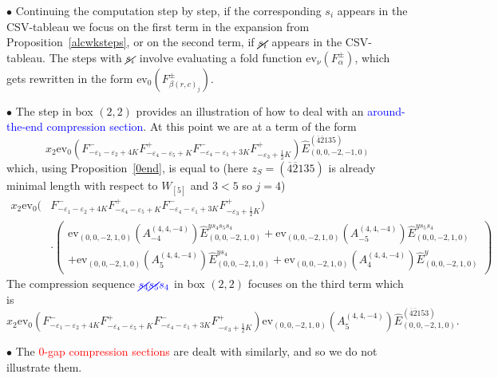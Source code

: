 \documentclass[11pt]{article}
\theoremstyle{plain}
\theoremstyle{definition}
\newenvironment{example}
  {\pushQED{\qed}\exampleinner}
  {\popQED\endexampleinner}
\theoremstyle{remark}
\numberwithin{equation}{section}
\def\ev{\mathrm{ev}}
\newcounter{r}
\newcounter{s}
\begin{document}
\begin{example}
\noindent
$\bullet$ Continuing the computation step by step, if the corresponding $s_i$ appears in the CSV-tableau we focus on the first term in the
expansion from Proposition~\ref{alcwksteps}, or on the second term, if $\cancel{s_i}$ appears in the CSV-tableau. 
The steps with $\cancel{s_i}$ involve evaluating a fold function $\ev_\nu(F_{\alpha}^{\pm})$, which gets rewritten in the
form $\ev_0(F^\pm_{\beta(r,c)_j})$.

\noindent
$\bullet$ The step in box $(2,2)$ provides an illustration of how to deal with an \textcolor{blue}{around-the-end compression section}. 
At this point we are at a term of the form
$$
x_2\ev_0(F^-_{-\varepsilon_1-\varepsilon_2+4K} F^+_{-\varepsilon_4-\varepsilon_5+K}
F^-_{-\varepsilon_4-\varepsilon_1+3K} F^+_{-\varepsilon_3+\frac12K}) \widehat{E}^{(\overline{4}\overline{2}135)}_{(0,0,-2,-1,0)}
$$
which, using Proposition~\ref{0end}, is equal to (here $z_S=(\overline{4}{\overline{2}135})$ is already minimal length with respect to $W_{[5]}$ and $3<5$ so $j=4$) 
\begin{align*}
x_2\ev_0(&F^-_{-\varepsilon_1-\varepsilon_2+4K} F^+_{-\varepsilon_4-\varepsilon_5+K}
F^-_{-\varepsilon_4-\varepsilon_1+3K} F^+_{-\varepsilon_3+\frac12K})
\\
&\cdot \left( \begin{array}{l}
\ev_{(0,0,-2,1,0)}(A^{(4,4,-4)}_{-4})\widehat{E}^{ys_4s_5s_4}_{(0,0,-2,1,0)}
+\ev_{(0,0,-2,1,0)}(A^{(4,4,-4)}_{-5})\widehat{E}^{ys_5s_4}_{(0,0,-2,1,0)}
\\
+\ev_{(0,0,-2,1,0)}(A^{(4,4,-4)}_{5})\widehat{E}^{ys_4}_{(0,0,-2,1,0)}
+\ev_{(0,0,-2,1,0)}(A^{(4,4,-4)}_{4})\widehat{E}^{y}_{(0,0,-2,1,0)}
\end{array}
\right)
\end{align*}
The compression sequence $\textcolor{blue}{\cancel{s_4}\cancel{s_5}s_4}$ in box $(2,2)$ focuses on the third term which is
$$x_2\ev_0(F^-_{-\varepsilon_1-\varepsilon_2+4K} F^+_{-\varepsilon_4-\varepsilon_5+K}
F^-_{-\varepsilon_4-\varepsilon_1+3K} F^+_{-\varepsilon_3+\frac12K})
\ev_{(0,0,-2,1,0)}(A^{(4,4,-4)}_{5})\widehat{E}^{(\overline{4}\overline{2}153)}_{(0,0,-2,1,0)}.
$$

\noindent
$\bullet$
The \textcolor{red}{$0$-gap compression sections} are dealt with similarly, and so we do not illustrate them. 


\end{example}
\end{document}
